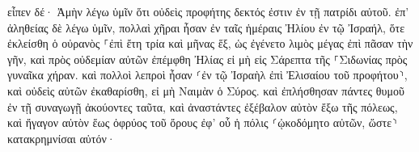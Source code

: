 \documentclass{openreader}
\begin{document}
εἶπεν δέ· Ἀμὴν λέγω ὑμῖν ὅτι οὐδεὶς προφήτης δεκτός ἐστιν ἐν τῇ πατρίδι αὐτοῦ. 
ἐπ’ ἀληθείας δὲ λέγω ὑμῖν, πολλαὶ χῆραι ἦσαν ἐν ταῖς ἡμέραις Ἠλίου ἐν τῷ Ἰσραήλ, ὅτε ἐκλείσθη ὁ οὐρανὸς ⸀ἐπὶ ἔτη τρία καὶ μῆνας ἕξ, ὡς ἐγένετο λιμὸς μέγας ἐπὶ πᾶσαν τὴν γῆν, 
καὶ πρὸς οὐδεμίαν αὐτῶν ἐπέμφθη Ἠλίας εἰ μὴ εἰς Σάρεπτα τῆς ⸀Σιδωνίας πρὸς γυναῖκα χήραν. 
καὶ πολλοὶ λεπροὶ ἦσαν ⸂ἐν τῷ Ἰσραὴλ ἐπὶ Ἐλισαίου τοῦ προφήτου⸃, καὶ οὐδεὶς αὐτῶν ἐκαθαρίσθη, εἰ μὴ Ναιμὰν ὁ Σύρος. 
καὶ ἐπλήσθησαν πάντες θυμοῦ ἐν τῇ συναγωγῇ ἀκούοντες ταῦτα, 
καὶ ἀναστάντες ἐξέβαλον αὐτὸν ἔξω τῆς πόλεως, καὶ ἤγαγον αὐτὸν ἕως ὀφρύος τοῦ ὄρους ἐφ’ οὗ ἡ πόλις ⸂ᾠκοδόμητο αὐτῶν, ὥστε⸃ κατακρημνίσαι αὐτόν· 
\end{document}
